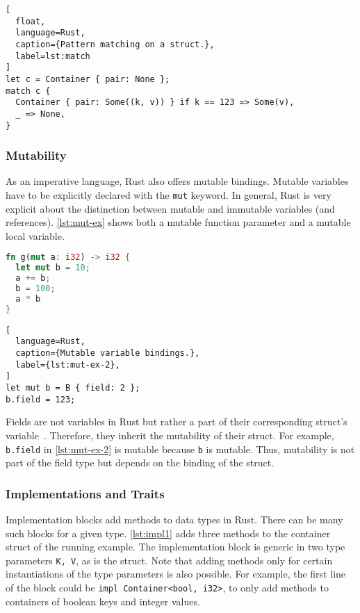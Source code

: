 \begin{lstlisting}[
  float,
  language=Rust,
  caption={Pattern matching on a struct.},
  label=lst:match
]
let c = Container { pair: None };
match c {
  Container { pair: Some((k, v)) } if k == 123 => Some(v),
  _ => None,
}
\end{lstlisting}

\subsubsection{Mutability}

As an imperative language, Rust also offers mutable bindings. Mutable variables
have to be explicitly declared with the \lstinline!mut! keyword. In general,
Rust is very explicit about the distinction between mutable and immutable
variables (and references). \autoref{lst:mut-ex} shows both a mutable function
parameter and a mutable local variable.

\noindent\begin{minipage}[t]{.48\textwidth}
\begin{lstlisting}[language=Rust, caption={Mutable variable bindings.}, label=lst:mut-ex]
fn g(mut a: i32) -> i32 {
  let mut b = 10;
  a += b;
  b = 100;
  a * b
}
\end{lstlisting}
\end{minipage}\hfill
\begin{minipage}[t]{.48\textwidth}
\begin{lstlisting}[
  language=Rust,
  caption={Mutable variable bindings.},
  label={lst:mut-ex-2},
]
let mut b = B { field: 2 };
b.field = 123;
\end{lstlisting}
\end{minipage}

Fields are not variables in Rust but rather a part of their corresponding
struct's variable~\cite{rustref}. Therefore, they inherit the mutability of
their struct. For example, \lstinline!b.field! in \autoref{lst:mut-ex-2} is
mutable because \lstinline!b! is mutable. Thus, mutability is not
part of the field type but depends on the binding of the struct.

\subsubsection{Implementations and Traits}

Implementation blocks add methods to data types in Rust. There can be many such
blocks for a given type. \autoref{lst:impl1} adds three methods to the container
struct of the running example. The implementation block is generic in two type
parameters \passthrough{\lstinline!K, V!}, as is the struct. Note that adding
methods only for certain instantiations of the  type parameters is also
possible. For example, the first line of the block could be
\passthrough{\lstinline!impl Container<bool, i32>!}, to only add methods to
containers of boolean keys and integer values.

